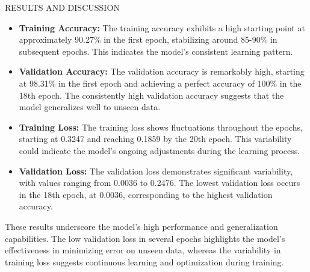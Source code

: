 \begin{section}[]{\uppercase{Results and Discussion}}
\begin{itemize}
    \item \textbf{Training Accuracy:} The training accuracy exhibits a high starting point at approximately 90.27\% in the first epoch, stabilizing around 85-90\% in subsequent epochs. This indicates the model's consistent learning pattern.
    \item \textbf{Validation Accuracy:} The validation accuracy is remarkably high, starting at 98.31\% in the first epoch and achieving a perfect accuracy of 100\% in the 18th epoch. The consistently high validation accuracy suggests that the model generalizes well to unseen data.
    \item \textbf{Training Loss:} The training loss shows fluctuations throughout the epochs, starting at 0.3247 and reaching 0.1859 by the 20th epoch. This variability could indicate the model's ongoing adjustments during the learning process.
    \item \textbf{Validation Loss:} The validation loss demonstrates significant variability, with values ranging from 0.0036 to 0.2476. The lowest validation loss occurs in the 18th epoch, at 0.0036, corresponding to the highest validation accuracy.
\end{itemize}

These results underscore the model's high performance and generalization capabilities. The low validation loss in several epochs highlights the model's effectiveness in minimizing error on unseen data, whereas the variability in training loss suggests continuous learning and optimization during training.


\end{section}
